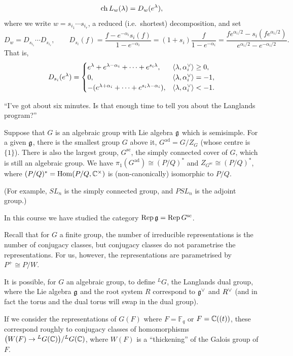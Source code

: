\begin{theorem}
\[
  \operatorname{ch} L_w(\lambda) = D_w(e^\lambda),
\]
where we write $w = s_{i_1}\cdots s_{i_r}$, a reduced (i.e.\ shortest)
decomposition, and set
\[
  D_w = D_{s_{i_1}}\cdots D_{s_{i_r}}, \qquad
  D_{s_i}(f) = \frac{f - e^{-\alpha_i}s_i(f)}{1 - e^{-\alpha_i}}
    = (1 + s_i)\frac{f}{1 - e^{-\alpha_i}}
    = \frac{f e^{\alpha_i/2} - s_i(f e^{\alpha_i/2})}{e^{\alpha_i/2} - e^{-\alpha_i/2}}.
\]
That is,
\[
  D_{s_i}(e^\lambda) = \begin{cases}
    e^\lambda + e^{\lambda - \alpha_i} + \dots + e^{s_i\lambda}, & \langle \lambda,\alpha_i^{\vee}\rangle \geq 0,\\
    0, & \langle \lambda,\alpha_i^{\vee}\rangle = -1,\\
    -(e^{\lambda + \alpha_i} + \dots + e^{s_i\lambda - \alpha_i}), & \langle \lambda,\alpha_i^{\vee}\rangle < -1.
  \end{cases}
\]
\end{theorem}

``I've got about six minutes. Is that enough time to tell you about the
Langlands program?''

Suppose that $G$ is an algebraic group with Lie algebra $\mathfrak{g}$ which is
semisimple. For a given $\mathfrak{g}$, there is the smallest group $G$ above it,
$G^{\mathrm{ad}} = G/Z_G$ (whose centre is $\{1\}$). There is also the largest
group, $G^{\mathrm{sc}}$, the simply connected cover of $G$, which is still an
algebraic group. We have $\pi_1(G^{\mathrm{ad}}) \cong (P/Q)^*$ and
$Z_{G^{\mathrm{sc}}} \cong (P/Q)^*$, where $(P/Q)^* = \operatorname{Hom}(P/Q, \mathbb{C}^\times)$
is (non-canonically) isomorphic to $P/Q$.

(For example, $SL_n$ is the simply connected group, and $PSL_n$ is the adjoint
group.)

In this course we have studied the category
$\operatorname{Rep} \mathfrak{g} = \operatorname{Rep} G^{\mathrm{sc}}$.

Recall that for $G$ a finite group, the number of irreducible representations
is the number of conjugacy classes, but conjugacy classes do not parametrise
the representations. For us, however, the representations are parametrised
by $P^+ \cong P/W$.

It is possible, for $G$ an algebraic group, to define ${}^LG$, the Langlands
dual group, where the Lie algebra $\mathfrak{g}$ and the root system $R$ correspond to
$\mathfrak{g}^{\vee}$ and $R^{\vee}$ (and in fact the torus and the dual torus will swap in the
dual group).

If we consider the representations of $G(F)$ where $F = \mathbb{F}_q$ or
$F = \mathbb{C}((t))$, these correspond roughly to conjugacy classes of homomorphisms
$\bigl(W(F) \to {}^LG(\mathbb{C})\bigr)/{}^LG(\mathbb{C})$, where $W(F)$ is a ``thickening''
of the Galois group of $F$.
